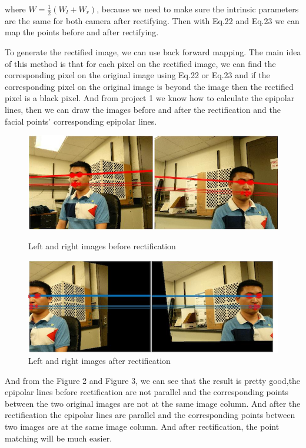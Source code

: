 \documentclass{article}
\begin{document}
where $W=\frac{1}{2}(W_l+W_r)$, because we need to make sure the intrinsic parameters are the same for both camera after rectifying. Then with Eq.22 and Eq.23 we can map the points before and after rectifying. 
\par 
To generate the rectified image, we can use back forward mapping. The main idea of this method is that for each pixel on the rectified image, we can find the corresponding pixel on the original image using Eq.22 or Eq.23 and if the corresponding pixel on the original image is beyond the image then the rectified pixel is a black pixel. And from project 1 we know how to calculate the epipolar lines, then we can draw the images before and after the rectification and the facial points' corresponding epipolar lines.
\begin{figure}[H]
\centering
\includegraphics[scale=0.55]{1.png}
\caption{Left and right images before rectification}
\label{fig:label}
\centering
\includegraphics[scale=0.55]{3.png}
\caption{Left and right images after rectification}
\label{fig:label}
\end{figure}
And from the Figure 2 and Figure 3, we can see that the result is pretty good,the epipolar lines before rectification are not parallel and the corresponding points between the two original images are not at the same image column. And after the rectification the epipolar lines are parallel and the corresponding points between two images are at the same image column. And after rectification, the point matching will be much easier.
\end{document}
